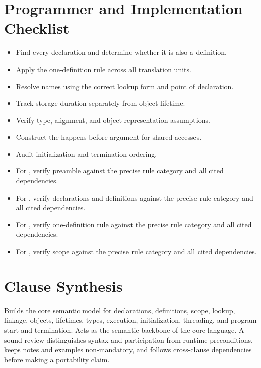 \documentclass[11pt,letterpaper]{article}
\begin{document}
\section{Programmer and Implementation Checklist}
\begin{CornellReferenceChecklistBox}\begin{itemize}[label=$\square$]
\item Find every declaration and determine whether it is also a definition.
\item Apply the one-definition rule across all translation units.
\item Resolve names using the correct lookup form and point of declaration.
\item Track storage duration separately from object lifetime.
\item Verify type, alignment, and object-representation assumptions.
\item Construct the happens-before argument for shared accesses.
\item Audit initialization and termination ordering.
\item For , verify preamble against the precise rule category and all cited dependencies.
\item For , verify declarations and definitions against the precise rule category and all cited dependencies.
\item For , verify one-definition rule against the precise rule category and all cited dependencies.
\item For , verify scope against the precise rule category and all cited dependencies.
\end{itemize}\end{CornellReferenceChecklistBox}
\section{Clause Synthesis}
\begin{CornellReferenceOrientationBox}Builds the core semantic model for declarations, definitions, scope, lookup, linkage, objects, lifetimes, types, execution, initialization, threading, and program start and termination. Acts as the semantic backbone of the core language. A sound review distinguishes syntax and participation from runtime preconditions, keeps notes and examples non-mandatory, and follows cross-clause dependencies before making a portability claim.\end{CornellReferenceOrientationBox}
\end{document}
